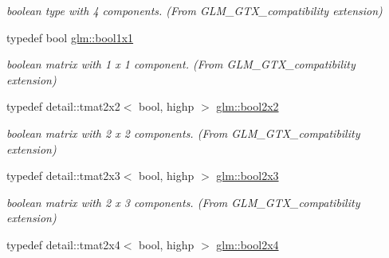 \begin{CompactItemize}
\begin{CompactList}\small\item\em boolean type with 4 components. (From GLM\_\-GTX\_\-compatibility extension) \item\end{CompactList}\item 
\hypertarget{group__gtx__compatibility_g98d9d3da22aebc872ba38ce5afa0eff7}{
typedef bool \hyperlink{group__gtx__compatibility_g98d9d3da22aebc872ba38ce5afa0eff7}{glm::bool1x1}}
\label{group__gtx__compatibility_g98d9d3da22aebc872ba38ce5afa0eff7}

\begin{CompactList}\small\item\em boolean matrix with 1 x 1 component. (From GLM\_\-GTX\_\-compatibility extension) \item\end{CompactList}\item 
\hypertarget{group__gtx__compatibility_g44cd09c0dad9ea163f038a342555867f}{
typedef detail::tmat2x2$<$ bool, highp $>$ \hyperlink{group__gtx__compatibility_g44cd09c0dad9ea163f038a342555867f}{glm::bool2x2}}
\label{group__gtx__compatibility_g44cd09c0dad9ea163f038a342555867f}

\begin{CompactList}\small\item\em boolean matrix with 2 x 2 components. (From GLM\_\-GTX\_\-compatibility extension) \item\end{CompactList}\item 
\hypertarget{group__gtx__compatibility_g75013772bb088d107a1c1a994e7f9b14}{
typedef detail::tmat2x3$<$ bool, highp $>$ \hyperlink{group__gtx__compatibility_g75013772bb088d107a1c1a994e7f9b14}{glm::bool2x3}}
\label{group__gtx__compatibility_g75013772bb088d107a1c1a994e7f9b14}

\begin{CompactList}\small\item\em boolean matrix with 2 x 3 components. (From GLM\_\-GTX\_\-compatibility extension) \item\end{CompactList}\item 
\hypertarget{group__gtx__compatibility_gf24096d8a88d274b94002386a3fcab0c}{
typedef detail::tmat2x4$<$ bool, highp $>$ \hyperlink{group__gtx__compatibility_gf24096d8a88d274b94002386a3fcab0c}{glm::bool2x4}}
\label{group__gtx__compatibility_gf24096d8a88d274b94002386a3fcab0c}


\end{CompactItemize}
